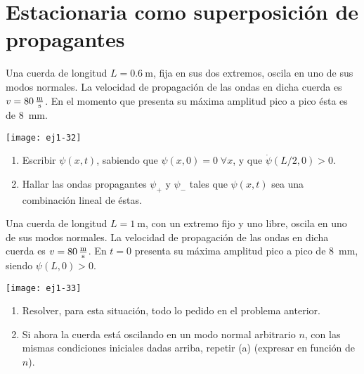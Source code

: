 \section*{Estacionaria como superposición de propagantes}

\item 
\begin{minipage}[t][2cm]{0.6\textwidth}
Una cuerda de longitud $L = \SI{0.6}{\metre}$, fija en sus dos extremos, oscila en uno de sus modos normales.
La velocidad de propagación de las ondas en dicha cuerda es \(v = \SI{80}{\metre\over\second}\).
En el momento que presenta su máxima amplitud pico a pico ésta es de \SI{8}{\milli\metre}.
\end{minipage}
\begin{minipage}[c][0.8cm][t]{0.34\textwidth}
	\texttt{[image: ej1-32]}
\end{minipage}
\begin{enumerate}
	\item Escribir $\psi(x,t)$, sabiendo que $\psi(x,0) = 0\;\forall x$, y que $\dot{\psi}(L/2,0) > 0$.
	\item Hallar las ondas propagantes $\psi_+$ y \(\psi_-\) tales que $\psi(x,t)$ sea una combinación lineal de éstas.
\end{enumerate}


\item 
\begin{minipage}[t][2.5cm]{0.6\textwidth}
Una cuerda de longitud $L = \SI{1}{\metre}$, con un extremo fijo y uno libre, oscila en uno de sus modos normales.
La velocidad de propagación de las ondas en dicha cuerda es \(v= \SI{80}{\metre\over\second}\).
En \(t = 0\) presenta su máxima amplitud pico a pico de \SI{8}{\milli\metre}, siendo $\psi(L,0) > 0$.
\end{minipage}
\begin{minipage}[c][0.2cm][t]{0.34\textwidth}
	\texttt{[image: ej1-33]}
\end{minipage}
\begin{enumerate}
	\item Resolver, para esta situación, todo lo pedido en el problema anterior. 
	\item Si ahora la cuerda está oscilando en un modo normal arbitrario $n$, con las mismas condiciones iniciales dadas arriba, repetir (a) (expresar en función de $n$).
\end{enumerate}

